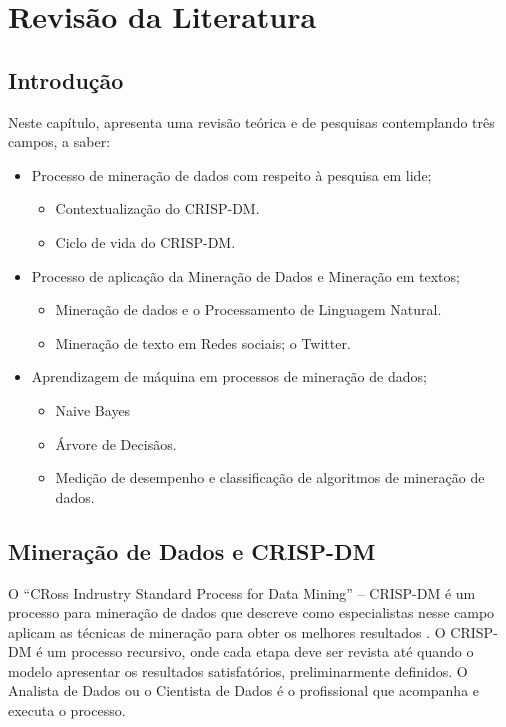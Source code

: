 \chapter{Revisão da Literatura}\label{arte}


\section{Introdução}\label{arte:intro}

Neste capítulo, apresenta uma revisão teórica e de pesquisas contemplando três campos, a saber: 
  \begin{itemize}
    \item Processo de mineração de dados com respeito à pesquisa em lide;
      \begin{itemize}
      	\item Contextualização do CRISP-DM.
      	\item Ciclo de vida do CRISP-DM.
      \end{itemize}
       
    \item Processo de aplicação da Mineração de Dados e Mineração em textos; 
	    \begin{itemize}
	    	\item Mineração de dados e o Processamento de Linguagem Natural.
	    	\item Mineração de texto em Redes sociais; o Twitter.
	    \end{itemize}
    \item Aprendizagem de máquina em processos de mineração de dados;
	    \begin{itemize}
	    	\item Naive Bayes
	    	\item Árvore de Decisãos.
	    	\item Medição de desempenho e classificação de algoritmos de mineração de dados.
	    \end{itemize}
  \end{itemize}


  
\section{Mineração de Dados e CRISP-DM}

O ``CRoss Indrustry Standard Process for Data Mining'' -- CRISP-DM é um processo para mineração de dados que descreve como especialistas 
nesse campo aplicam as técnicas de mineração para obter os melhores resultados \cite{Crisp2000}.
O CRISP-DM é um processo recursivo, onde cada etapa deve ser revista até quando o modelo apresentar os resultados satisfatórios, preliminarmente definidos.
O Analista de Dados ou o Cientista de Dados é o profissional que acompanha e executa o processo.


